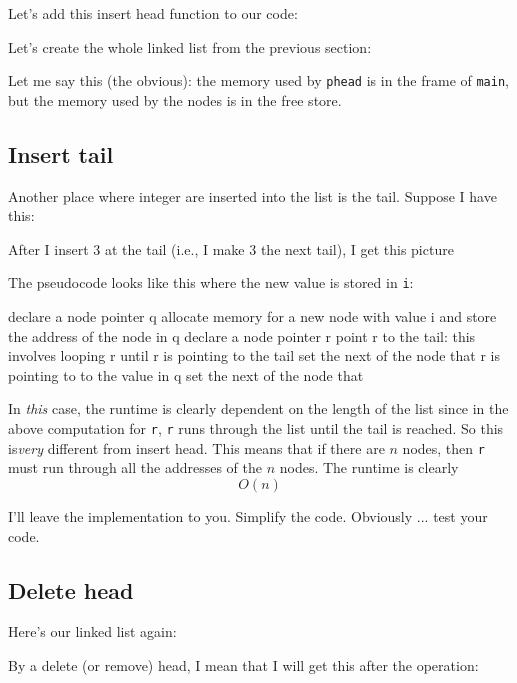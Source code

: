 Let's add this insert head function to our code:

Let's create the whole linked list from the previous section:

Let me say this (the obvious):
the memory used by \verb!phead! is in the frame of \verb!main!,
but the memory used by the nodes is in the free store.


\newpage
\subsection{Insert tail}

Another place where integer are inserted into the list is the tail.
Suppose I have this:



After I insert 3 at the tail (i.e., I make 3 the next tail), I get this
picture



The pseudocode looks like this where the new value is stored in \verb!i!:
\begin{console}[frame=single]
declare a node pointer q 
allocate memory for a new node with value i and
    store the address of the node in q
declare a node pointer r
point r to the tail: this involves looping r
    until r is pointing to the tail
set the next of the node that r is pointing to to the
    value in q
set the next of the node that 
\end{console}

In \textit{this} case, the runtime is clearly dependent on the length
of the list since in the above computation for \verb!r!,
\verb!r! runs through the list until the tail is reached.
So this is\textit{very} different from insert head.
This means that if there are $n$ nodes, then \verb!r! must
run through all the addresses of the $n$ nodes.
The runtime is clearly
\[
O(n)
\]

I'll leave the implementation to you.
Simplify the code.
Obviously ... test your code.


\newpage
\subsection{Delete head}

Here's our linked list again:



By a delete (or remove) head, I mean that I will get this after the operation:



